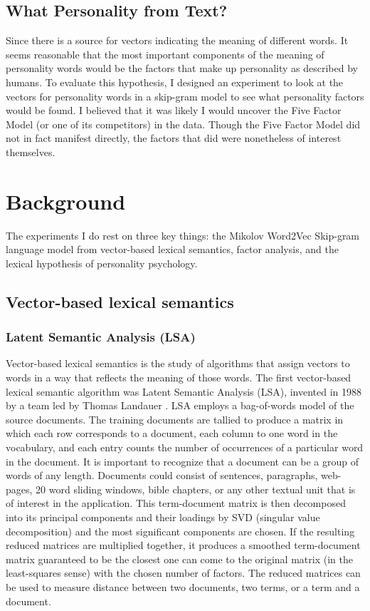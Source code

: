 \section{What Personality from Text?}

Since there is a source for vectors indicating the meaning of
different words.  It seems reasonable that the most important
components of the meaning of personality words would be the factors
that make up personality as described by humans. To evaluate this
hypothesis, I designed an experiment to look at the vectors for
personality words in a skip-gram model to see what personality factors
would be found. I believed that it was likely I would uncover the Five
Factor Model (or one of its competitors) in the data. Though the Five
Factor Model did not in fact manifest directly, the factors that did
were nonetheless of interest themselves.

\chapter{Background}

The experiments I do rest on three key things: the Mikolov Word2Vec 
Skip-gram language model from vector-based lexical semantics, factor 
analysis, and the lexical hypothesis of personality psychology.

\section{Vector-based lexical semantics}

\subsection{Latent Semantic Analysis (LSA)}

Vector-based lexical semantics is the study of algorithms that assign vectors to 
words in a way that reflects the meaning of those words. The first vector-based 
lexical semantic algorithm was Latent Semantic Analysis (LSA), invented in 
1988 by a team led by Thomas Landauer \citep{Dumais1988}. LSA employs a bag-of-words model of 
the source documents. The training documents are tallied to produce a matrix in which each 
row corresponds to a document, each column to one word in the vocabulary, and 
each entry counts the number of occurrences of a particular word in the 
document. It is important to recognize that a document can be a group of words 
of any length. Documents could consist of sentences, paragraphs, web-pages, 20 
word sliding windows, bible chapters, or any other textual unit that is of 
interest in the application. This term-document matrix is then decomposed into 
its principal components and their loadings by SVD (singular value 
decomposition) and the most significant components are chosen. If the resulting 
reduced matrices are multiplied together, it produces a smoothed term-document 
matrix guaranteed to be the closest one can come to the original matrix (in the 
least-squares sense) with the chosen number of factors. The reduced matrices
can be used to measure distance between two documents, two terms, or a term and
a document.

